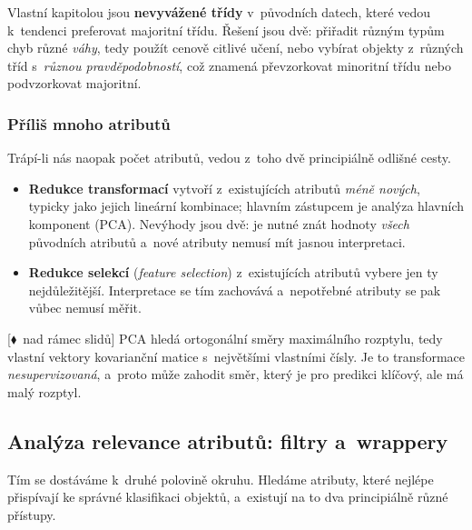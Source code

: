 \documentclass[11pt,a4paper]{article}
\theoremstyle{definition}
\newcommand{\mimo}{\textcolor{markcol}{\textsf{\footnotesize[$\blacklozenge$~nad rámec slidů]}}}
\begin{document}
Vlastní kapitolou jsou \textbf{nevyvážené třídy} v~původních datech, které vedou k~tendenci
preferovat majoritní třídu. Řešení jsou dvě: přiřadit různým typům chyb různé
\emph{váhy}, tedy použít cenově citlivé učení, nebo vybírat objekty z~různých tříd
s~\emph{různou pravděpodobností}, což znamená převzorkovat minoritní třídu nebo podvzorkovat
majoritní.

\subsubsection{Příliš mnoho atributů}

Trápí-li nás naopak počet atributů, vedou z~toho dvě principiálně odlišné cesty.

\begin{itemize}
\item \textbf{Redukce transformací} vytvoří z~existujících atributů \emph{méně nových},
      typicky jako jejich lineární kombinace; hlavním zástupcem je analýza hlavních komponent
      (PCA). Nevýhody jsou dvě: je nutné znát hodnoty \emph{všech} původních atributů a~nové
      atributy nemusí mít jasnou interpretaci.
\item \textbf{Redukce selekcí} (\emph{feature selection}) z~existujících atributů vybere jen
      ty nejdůležitější. Interpretace se tím zachovává a~nepotřebné atributy se pak vůbec
      nemusí měřit.
\end{itemize}

\mimo{} PCA hledá ortogonální směry maximálního rozptylu, tedy vlastní vektory kovarianční
matice s~největšími vlastními čísly. Je to transformace \emph{nesupervizovaná}, a~proto může
zahodit směr, který je pro predikci klíčový, ale má malý rozptyl.

\subsection{Analýza relevance atributů: filtry a~wrappery}
\label{ssec:filtr}

Tím se dostáváme k~druhé polovině okruhu. Hledáme atributy, které nejlépe přispívají ke
správné klasifikaci objektů, a~existují na to dva principiálně různé přístupy.
\end{document}
